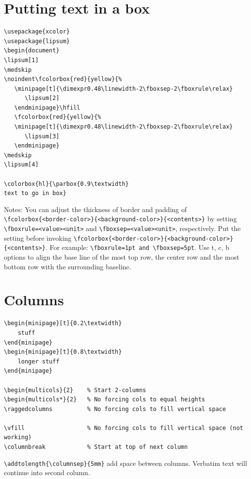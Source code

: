 \documentclass{article}
\begin{document}
\section{Putting text in a box}
\begin{verbatim}
\usepackage{xcolor}
\usepackage{lipsum}
\begin{document}
\lipsum[1]
\medskip
\noindent\fcolorbox{red}{yellow}{%
   \minipage[t]{\dimexpr0.48\linewidth-2\fboxsep-2\fboxrule\relax}
      \lipsum[2]
   \endminipage}\hfill
   \fcolorbox{red}{yellow}{%
   \minipage[t]{\dimexpr0.48\linewidth-2\fboxsep-2\fboxrule\relax}
      \lipsum[3]
   \endminipage}
\medskip
\lipsum[4]

\colorbox{hl}{\parbox{0.9\textwidth}
text to go in box}
\end{verbatim}

Notes:
You can adjust the thickness of border and padding of
\verb|\fcolorbox{<border-color>}{<background-color>}{<contents>}|
by setting \verb|\fboxrule=<value><unit>| and
\verb|\fboxsep=<value><unit>|, respectively. Put the setting
before invoking
\verb|\fcolorbox{<border-color>}{<background-color>}{<contents>}|.
For example: \verb|\fboxrule=1pt and \fboxsep=5pt|. Use
\textrm{t}, \textrm{c}, \textrm{b}
options to align the base line of the most top row,
the center row and the most bottom row with the surrounding baseline.

\section{Columns}
\begin{verbatim}
\begin{minipage}[t]{0.2\textwidth}
    stuff
\end{minipage}
\begin{minipage}[t]{0.8\textwidth}
    longer stuff
\end{minipage}

\begin{multicols}{2}    % Start 2-columns
\begin{multicols*}{2}   % No forcing cols to equal heights
\raggedcolumns          % No forcing cols to fill vertical space

\vfill                  % No forcing cols to fill vertical space (not working)
\columnbreak            % Start at top of next column
\end{verbatim}

\verb|\addtolength{\columnsep}{5mm}| add space between columns.
Verbatim text will continue into second column.
\end{document}
